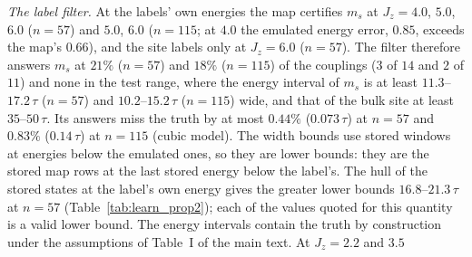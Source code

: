 \documentclass[aps,prx,onecolumn,10pt,nofootinbib,longbibliography,floatfix]{revtex4-2}
\theoremstyle{remark}
\newcommand{\Jz}{J_z}
\newcommand{\ms}{m_s}
\begin{document}
\emph{The label filter.} At the labels' own energies the map certifies $\ms$ at $\Jz=4.0$, $5.0$, %
$6.0$ ($n=57$) and $5.0$, $6.0$ ($n=115$; at $4.0$ the emulated energy error, $0.85$, exceeds the map's $0.66$), and %
the site labels only at $\Jz=6.0$ ($n=57$). The filter therefore answers $\ms$ at $21\%$ ($n=57$) and $18\%$ ($n=115$) of %
the couplings ($3$ of $14$ and $2$ of $11$) and none in the test range, where the energy interval of $\ms$ is at least $11.3$--$17.2\,\tau$ %
($n=57$) and $10.2$--$15.2\,\tau$ ($n=115$) wide, and that of the bulk site at least $35$--$50\,\tau$. Its answers %
miss the truth by at most $0.44\%$ ($0.073\,\tau$) at $n=57$ and $0.83\%$ ($0.14\,\tau$) at $n=115$ (cubic model). %
The width bounds use stored windows at energies below the emulated ones, so they are lower bounds: they are the
stored map rows at the last stored energy below the label's. The hull of the stored states at the label's own
energy gives the greater lower bounds $16.8$--$21.3\,\tau$ at $n=57$ (Table~\ref{tab:learn_prop2}); each of the %
values quoted for this quantity is a valid lower bound. The energy
intervals contain the truth by construction under the assumptions of Table~I of the main text. At $\Jz=2.2$ and $3.5$ %
\end{document}
